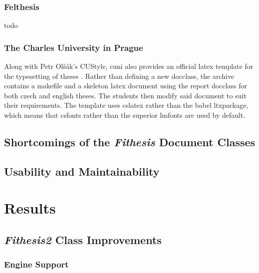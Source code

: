       \subsection{Felthesis}
      \gls{todo}

      \subsection{The Charles University in Prague}
      Along with Petr Olšák's CUStyle, \gls{cuni} also provides an official \gls{latex} template for the typesetting of theses \cite{cunisablona}. Rather than defining a new \gls{docclass}, the archive contains a \gls{makefile} and a skeleton \gls{latex} document using the report \gls{docclass} for both czech and english theses. The students then modify said document to suit their requirements. The template uses \gls{cslatex} rather than the babel \gls{ltxpackage}, which means that \gls{csfonts} rather than the superior \gls{lmfonts} \cite{cslatexvsbabel} are used by default.


    \section{Shortcomings of the \emph{Fithesis} Document Classes}
    \blindtext

    \section{Usability and Maintainability}
    \blindtext

  \chapter{Results}
    \blindtext

    \section{\emph{Fithesis2} Class Improvements}  
    \blindtext

      \subsection{ Engine Support} 
      \blindtext

